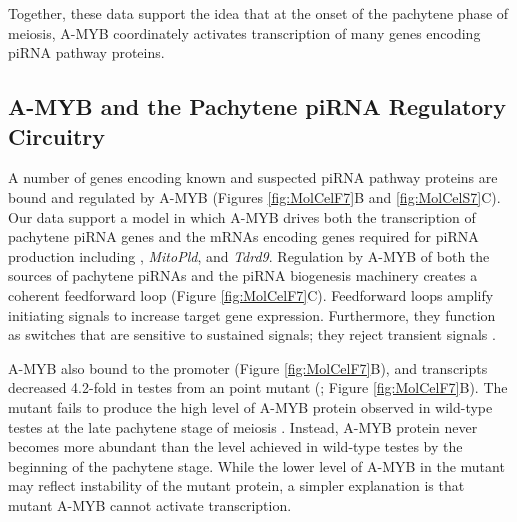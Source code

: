     Together, these data support the idea that at the onset of the pachytene phase of meiosis, A-MYB coordinately activates transcription of many genes encoding piRNA pathway proteins.

  \subsection{A-MYB and the Pachytene piRNA Regulatory Circuitry}

    A number of genes encoding known and suspected piRNA pathway proteins are bound and regulated by A-MYB (Figures \ref{fig:MolCelF7}B and \ref{fig:MolCelS7}C). Our data support a model in which A-MYB drives both the transcription of pachytene piRNA genes and the mRNAs encoding genes required for piRNA production including \miwi{}, \textit{MitoPld}, and \textit{Tdrd9}. Regulation by A-MYB of both the sources of pachytene piRNAs and the piRNA biogenesis machinery creates a coherent feedforward loop (Figure \ref{fig:MolCelF7}C). Feedforward loops amplify initiating signals to increase target gene expression. Furthermore, they function as switches that are sensitive to sustained signals; they reject transient signals \citep{Shen-Orr2002, Osella2011}. 

    A-MYB also bound to the \amyb{} promoter (Figure \ref{fig:MolCelF7}B), and \amyb{} transcripts decreased 4.2-fold in testes from an \amyb{} point mutant (\mybrepro{}; Figure \ref{fig:MolCelF7}B). The \amyb{} mutant fails to produce the high level of A-MYB protein observed in wild-type testes at the late pachytene stage of meiosis \citep{Bolcun-Filas2011}. Instead, A-MYB protein never becomes more abundant than the level achieved in wild-type testes by the beginning of the pachytene stage. While the lower level of A-MYB in the \amyb{} mutant may reflect instability of the mutant protein, a simpler explanation is that mutant A-MYB cannot activate \amyb{} transcription.

